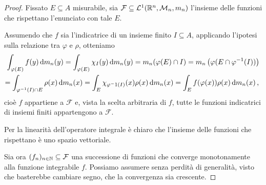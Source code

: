\begin{proof}
	Fissato $E\subseteq A$ misurabile, sia $\mathcal F\subseteq \mathcal L^1(\mathbb R^n,\mathcal M_n,m_n)$ l'insieme delle funzioni che rispettano l'enunciato con tale $E$.
	
	Assumendo che $f$ sia l'indicatrice di un insieme finito $I\subseteq A$, applicando l'ipotesi sulla relazione tra $\varphi$ e $\rho$, otteniamo
	\begin{multline*}
		\int_{\varphi(E)} f(y)\,\mathrm d m_n(y)=\int_{\varphi(E)} \chi_I(y)\,\mathrm d m_n(y)=m_n(\varphi(E)\cap I)=m_n\left(\varphi(E\cap \varphi^{-1}(I))\right) \\
		=\int_{\varphi^{-1}(I)\cap E}\rho(x)\,\mathrm d m_n(x)=\int_E \chi_{\varphi^-1(I)}(x)\rho(x)\,\mathrm d m_n(x)=\int_E f(\varphi(x))\rho(x)\,\mathrm d m_n(x) \, \text{, }
	\end{multline*}
	cioè $f$ appartiene a $\mathcal F$ e, vista la scelta arbitraria di $f$, tutte le funzioni indicatrici di insiemi finiti appartengono a $\mathcal F$.
	
	Per la linearità dell'operatore integrale è chiaro che l'insieme delle funzioni che rispettano è uno spazio vettoriale.
	
	Sia ora $(f_n)_{n\in\mathbb N}\subseteq \mathcal F$ una successione di funzioni che converge monotonamente alla funzione integrabile $f$. Possiamo assumere senza perdità di generalità, visto che basterebbe cambiare segno, che la convergenza sia crescente.
	

\end{proof}
